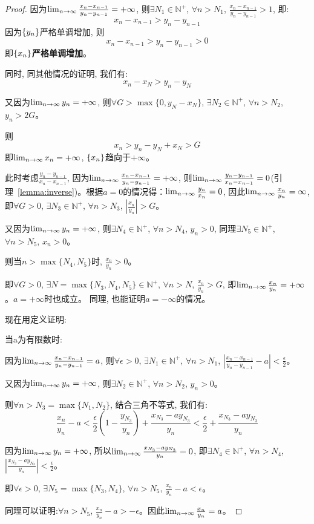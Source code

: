 \documentclass[lang=cn]{elegantbook}
\begin{document}
\begin{proof}
因为$\lim_{n \to \infty } \frac{x_n-x_{n-1}}{y_n-y_{n-1}} = +\infty$, 则$\exists N_1 \in \mathbb{N}^+$, $\forall n > N_1$, $\frac{x_n-x_{n-1}}{y_n-y_{n-1}} > 1$, 即:
\[ x_n - x_{n-1} > y_n - y_{n-1} \]
因为$\left\{ y_n\right\}$严格单调增加, 则
\[ x_n - x_{n-1} > y_n - y_{n-1}> 0 \]
即$\left\{ x_n\right\}${\bf 严格单调增加}。

同时, 同其他情况的证明, 我们有:
\[ x_n - x_N > y_n - y_N\]

又因为$\lim_{n \to \infty } y_n = +\infty$, 则$\forall G > \max\{0, y_N - x_N\}$, $\exists N_2 \in \mathbb{N}^+$, $\forall n > N_2$, $y_n > 2G$。

则
\[ x_n > y_n - y_N + x_N > G \]
即$\lim_{n \to \infty } x_n = +\infty$, $\left\{ x_n\right\}$趋向于$+\infty$。

此时考虑$\frac{y_n - y_{n-1}}{x_n - x_{n-1}}$, 因为$\lim_{n \to \infty } \frac{x_n-x_{n-1}}{y_n - y_{n-1}} = +\infty$, 则$\lim_{n \to \infty } \frac{y_n - y_{n-1}}{x_n-x_{n-1}} = 0$(引理~\ref{lemma:inverse})。根据$a = 0$的情况得：$\lim_{n \to \infty } \frac{y_n}{x_n} = 0$, 因此$\lim_{n \to \infty } \frac{x_n}{y_n} = \infty$, 即$\forall G > 0$, $\exists N_3 \in \mathbb{N}^+$, $\forall n > N_3$, $\left| \frac{x_n}{y_n} \right| > G$。

又因为$\lim_{n \to \infty } y_n = +\infty$, 则$\exists N_4 \in \mathbb{N}^+$, $\forall n > N_4$, $y_n > 0$, 同理$\exists N_5 \in \mathbb{N}^+$, $\forall n > N_5$, $x_n > 0$。

则当$n > \max\{ N_4, N_5 \}$时, $\frac{x_n}{y_n} > 0$。

即$\forall G > 0$, $\exists N = \max\{ N_3, N_4, N_5 \} \in \mathbb{N}^+$, $\forall n > N$, $\frac{x_n}{y_n} > G$, 即$\lim_{n \to \infty } \frac{x_n}{y_n} = +\infty$。$a = +\infty$时也成立。
同理, 也能证明$a = -\infty$的情况。


现在用定义证明:

当a为有限数时:

因为$\lim_{n \to \infty } \frac{x_n-x_{n-1}}{y_n-y_{n-1}} = a$, 则$\forall \epsilon > 0$, $\exists N_1 \in \mathbb{N}^+$, $\forall n > N_1$, $\left| \frac{x_n - x_{n-1}}{y_n - y_{n-1}} - a\right| < \frac{\epsilon}{2}$。

又因为$\lim_{n \to \infty } y_n = +\infty$, 则$\exists N_2 \in \mathbb{N}^+$, $\forall n > N_2$, $y_n > 0$。

则$\forall n > N_3 = \max\{N_1, N_2\}$, 结合三角不等式, 我们有:
\[ \frac{x_n}{y_n}-a < \frac{\epsilon}{2}\left(1 - \frac{y_{N_3}}{y_n}\right) + \frac{x_{N_3}-ay_{N_3}}{y_n} < \frac{\epsilon}{2} + \frac{x_{N_3}-ay_{N_3}}{y_n}\]

因为$\lim_{n \to \infty } y_n = +\infty$, 所以$\lim_{n \to \infty } \frac{x_{N_3}-ay_{N_3}}{y_n} = 0$, 即$\exists N_4 \in \mathbb{N}^+$, $\forall n > N_4$, $\left| \frac{x_{N_3}-ay_{N_3}}{y_n} \right| < \frac{\epsilon}{2}$。

即$\forall \epsilon > 0$, $\exists N_5 = \max\{N_3, N_4\}$, $\forall n > N_5$, $\frac{x_n}{y_n} - a < \epsilon$。

同理可以证明:$\forall n > N_5$, $\frac{x_n}{y_n} - a > -\epsilon$。因此$\lim_{n \to \infty } \frac{x_n}{y_n} = a$。
\end{proof}
\end{document}
